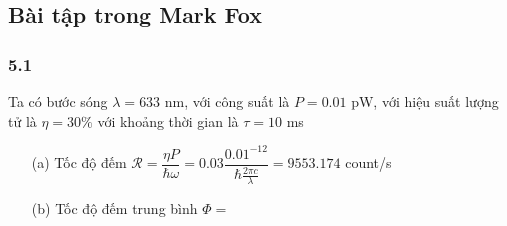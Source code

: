 \documentclass{article}
\newcommand{\f}[2]{\dfrac{#1}{#2}}
\begin{document}
\subsection*{Bài tập trong Mark Fox}
\subsubsection*{5.1}
Ta có bước sóng $\lambda = 633$ nm, với công suất là $P = 0.01$ pW, với hiệu suất lượng tử là $\eta = 30\% $ với khoảng thời gian là $\tau = 10$ ms
\begin{enumerate}
	\item[(a)] Tốc độ đếm $\mathcal{R} = \f{\eta P}{\hbar \omega} = 0.03 \f{0.01^{-12}}{\hbar \frac{2\pi c}{\lambda}} = 9553.174$ count/s
	\item[(b)] Tốc độ đếm trung bình $\Phi = $
\end{enumerate}
\end{document}
